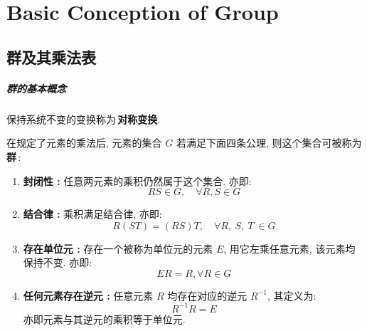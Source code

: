 \chapter{Basic Conception of Group}
\section{群及其乘法表}
    \paragraph{群的基本概念}
        \begin{Concept}[对称变换]
            保持系统不变的变换称为\,\textbf{对称变换}.
        \end{Concept}

        \begin{Definition}[群]
            在规定了元素的乘法后, 元素的集合 $G$ 若满足下面四条公理, 则这个集合可被称为\,\textbf{群}\,:
            \begin{enumerate}
                \item \textbf{封闭性 :} 任意两元素的乘积仍然属于这个集合. 亦即:
                    \begin{equation}
                        RS \in G, \quad \forall R, S \in G
                    \end{equation}
                \item \textbf{结合律 :} 乘积满足结合律, 亦即:
                    \begin{equation}
                        R (ST) = (RS) T, \quad \forall R,\ S,\ T\ \in G
                    \end{equation}
                \item \textbf{存在单位元 :} 存在一个被称为单位元的元素 $E$, 用它左乘任意元素, 该元素均保持不变. 亦即:
                    \begin{equation}
                        ER = R, \forall R \in G
                    \end{equation}
                \item \textbf{任何元素存在逆元 :} 任意元素 $R$ 均存在对应的逆元 $R^{-1}$, 其定义为:
                    \begin{equation}
                        R^{-1} R = E
                    \end{equation}
                    亦即元素与其逆元的乘积等于单位元.
            \end{enumerate}
        \end{Definition}

